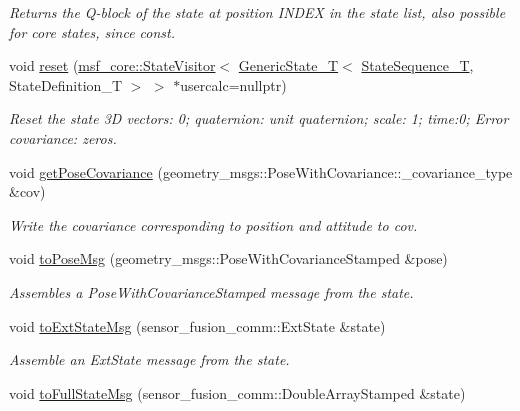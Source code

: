 \begin{DoxyCompactItemize}
\begin{DoxyCompactList}\small\item\em Returns the Q-\/block of the state at position I\-N\-D\-E\-X in the state list, also possible for core states, since const. \end{DoxyCompactList}\item 
void \hyperlink{structmsf__core_1_1GenericState__T_aff789c110efbe85318a6455adeb46497}{reset} (\hyperlink{classmsf__core_1_1StateVisitor}{msf\-\_\-core\-::\-State\-Visitor}$<$ \hyperlink{structmsf__core_1_1GenericState__T}{Generic\-State\-\_\-\-T}$<$ \hyperlink{structmsf__core_1_1GenericState__T_a75fe70f7c7517dbf7d4c91b75b08a1dd}{State\-Sequence\-\_\-\-T}, State\-Definition\-\_\-\-T $>$ $>$ $\ast$usercalc=nullptr)
\begin{DoxyCompactList}\small\item\em Reset the state 3\-D vectors\-: 0; quaternion\-: unit quaternion; scale\-: 1; time\-:0; Error covariance\-: zeros. \end{DoxyCompactList}\item 
void \hyperlink{structmsf__core_1_1GenericState__T_ac83be2ba4d55a9099b067f7e462a9ec7}{get\-Pose\-Covariance} (geometry\-\_\-msgs\-::\-Pose\-With\-Covariance\-::\-\_\-covariance\-\_\-type \&cov)
\begin{DoxyCompactList}\small\item\em Write the covariance corresponding to position and attitude to cov. \end{DoxyCompactList}\item 
void \hyperlink{structmsf__core_1_1GenericState__T_ad30ecf639ff4c96fd689412c5be91d6a}{to\-Pose\-Msg} (geometry\-\_\-msgs\-::\-Pose\-With\-Covariance\-Stamped \&pose)
\begin{DoxyCompactList}\small\item\em Assembles a Pose\-With\-Covariance\-Stamped message from the state. \end{DoxyCompactList}\item 
void \hyperlink{structmsf__core_1_1GenericState__T_aa94d1ef9bf4f2d3aea2d1cc9c6c04f50}{to\-Ext\-State\-Msg} (sensor\-\_\-fusion\-\_\-comm\-::\-Ext\-State \&state)
\begin{DoxyCompactList}\small\item\em Assemble an Ext\-State message from the state. \end{DoxyCompactList}\item 
void \hyperlink{structmsf__core_1_1GenericState__T_ab987d5916f3b7ab394539b46a9d5fabb}{to\-Full\-State\-Msg} (sensor\-\_\-fusion\-\_\-comm\-::\-Double\-Array\-Stamped \&state)

\end{DoxyCompactItemize}
